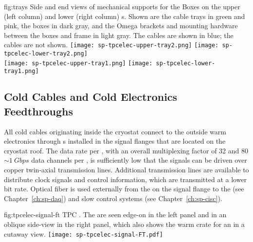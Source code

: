 \begin{dunefigure}
{fig:trays}
{Side and end views of mechanical supports for the  
Boxes on the upper (left column) and lower (right column) 
s. Shown are the  cable trays in green and pink, 
the  boxes in dark gray, and the Omega brackets and mounting 
hardware between the  boxes and  frame in light gray.  
The  cables are shown in blue; the  cables are not shown.}
\texttt{[image: sp-tpcelec-upper-tray2.png]}
\hspace{5mm}
\texttt{[image: sp-tpcelec-lower-tray2.png]} \\
\texttt{[image: sp-tpcelec-upper-tray1.png]}
\hspace{5mm}
\texttt{[image: sp-tpcelec-lower-tray1.png]}
\end{dunefigure}



\subsection{Cold Cables and Cold Electronics Feedthroughs}
\label{sec:fdsp-tpcelec-design-ft}

All cold cables originating inside the cryostat connect to the outside 
warm electronics through  \fdth{}s installed in the signal 
flanges that are located on the cryostat roof. The  data rate 
per , with an overall multiplexing factor of \num{32} and 
\num{80} $\sim\SI{1}{Gbps}$ data channels per , is 
sufficiently low that the  signals can be driven over 
copper twin-axial transmission lines. Additional transmission lines 
are available to distribute  clock signals and  
control information, which are transmitted at a lower bit rate.
Optical fiber is used externally from the  on the signal 
flange to the  (see Chapter~\ref{ch:sp-daq}) and slow 
control systems (see Chapter~\ref{ch:sp-cisc}).

\begin{dunefigure}
{fig:tpcelec-signal-ft}
{TPC  \fdth. The  are seen edge-on in the left 
panel and in an oblique side-view in the right panel, which also shows 
the warm crate for an  in a cutaway view.}
\texttt{[image: sp-tpcelec-signal-FT.pdf]}
\end{dunefigure}

